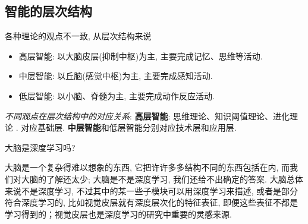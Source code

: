 \subsection{智能的层次结构}
各种理论的观点不一致, 从层次结构来说
\begin{itemize}
\item 高层智能: 以大脑皮层(抑制中枢)为主, 主要完成记忆、思维等活动.
\item 中层智能: 以丘脑(感觉中枢)为主, 主要完成感知活动.
\item 低层智能: 以小脑、脊髓为主, 主要完成动作反应活动.

\end{itemize}
\begin{remark}
\textit{不同观点在层次结构中的对应关系}: \textbf{高层智能}: 思维理论、知识阈值理论、进化理论 . 对应基础层. \textbf{中层智能}和低层智能分别对应技术层和应用层.
\end{remark}
\begin{think}
  大脑是深度学习吗? 
\end{think}
\begin{remark}
大脑是一个复杂得难以想象的东西, 它把许许多多结构不同的东西包括在内, 而我们对大脑的了解还太少; 大脑是不是深度学习, 我们还给不出确定的答案. 大脑总体来说不是深度学习, 不过其中的某一些子模块可以用深度学习来描述, 或者是部分符合深度学习的, 比如视觉皮层就有深度层次化的特征表征, 即便这些表征不都是学习得到的；视觉皮层也是深度学习的研究中重要的灵感来源.
\end{remark}
